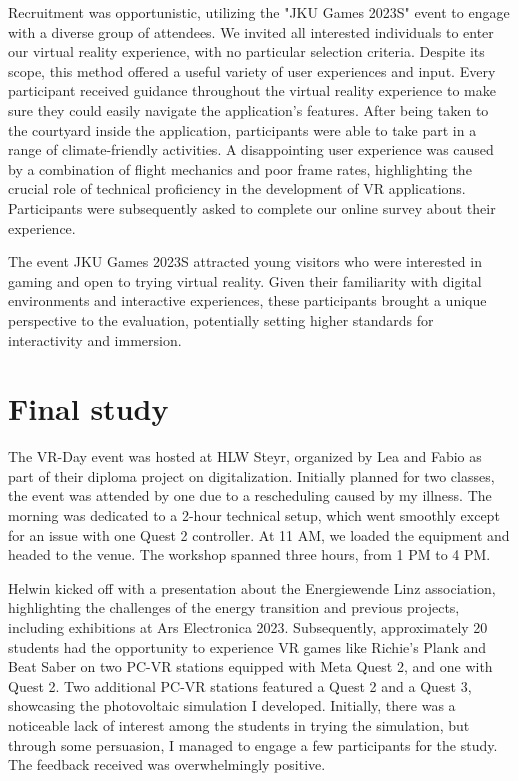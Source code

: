 \documentclass[draft, final]{vutinfth} %
\begin{document}
Recruitment was opportunistic, utilizing the "JKU Games 2023S" event to engage with a diverse group of attendees. We invited all interested individuals to enter our virtual reality experience, with no particular selection criteria. Despite its scope, this method offered a useful variety of user experiences and input. Every participant received guidance throughout the virtual reality experience to make sure they could easily navigate the application's features. After being taken to the courtyard inside the application, participants were able to take part in a range of climate-friendly activities. A disappointing user experience was caused by a combination of flight mechanics and poor frame rates, highlighting the crucial role of technical proficiency in the development of VR applications. Participants were subsequently asked to complete our online survey about their experience.

The event JKU Games 2023S attracted young visitors who were interested in gaming and open to trying virtual reality. Given their familiarity with digital environments and interactive experiences, these participants brought a unique perspective to the evaluation, potentially setting higher standards for interactivity and immersion.

    
\section{Final study}
The VR-Day event was hosted at HLW Steyr, organized by Lea and Fabio as part of their diploma project on digitalization. Initially planned for two classes, the event was attended by one due to a rescheduling caused by my illness. The morning was dedicated to a 2-hour technical setup, which went smoothly except for an issue with one Quest 2 controller. At 11 AM, we loaded the equipment and headed to the venue. The workshop spanned three hours, from 1 PM to 4 PM.

Helwin kicked off with a presentation about the Energiewende Linz association, highlighting the challenges of the energy transition and previous projects, including exhibitions at Ars Electronica 2023. Subsequently, approximately 20 students had the opportunity to experience VR games like Richie's Plank and Beat Saber on two PC-VR stations equipped with Meta Quest 2, and one with Quest 2. Two additional PC-VR stations featured a Quest 2 and a Quest 3, showcasing the photovoltaic simulation I developed. Initially, there was a noticeable lack of interest among the students in trying the simulation, but through some persuasion, I managed to engage a few participants for the study. The feedback received was overwhelmingly positive.
\end{document}
